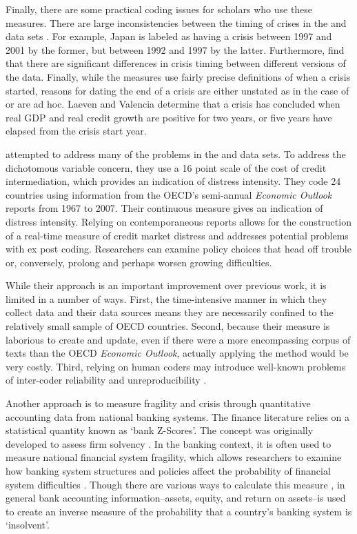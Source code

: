 \documentclass[]{article}
\begin{document}
Finally, there are some practical coding issues for scholars who use these measures. There are large inconsistencies between the timing of crises in the \cite{laeven2013} and \cite{Reinhart2009} data sets \citep{Chaudron2014}. For example, Japan is labeled as having a crisis between 1997 and 2001 by the former, but between 1992 and 1997 by the latter. Furthermore, \cite{GandrudHallerberg2015} find that there are significant differences in crisis timing between different versions of the \cite{laeven2013} data. Finally, while the measures use fairly precise definitions of when a crisis started, reasons for dating the end of a crisis are either unstated as in the case of \cite{Reinhart2009} or are ad hoc. Laeven and Valencia \citeyearpar[footnote 19]{laeven2013} determine that a crisis has concluded when real GDP and real credit growth are positive for two years, or five years have elapsed from the crisis start year.

\cite{Romer2015} attempted to address many of the problems in the \cite{Reinhart2009} and \cite{laeven2013} data sets. To address the dichotomous variable concern, they use a 16 point scale of the cost of credit intermediation, which provides an indication of distress intensity. They code 24 countries using information from the OECD's semi-annual \emph{Economic Outlook} reports from 1967 to 2007. Their  continuous measure gives an indication of distress intensity. Relying on contemporaneous reports allows for the construction of a real-time measure of credit market distress and addresses potential problems with ex post coding. Researchers can examine policy choices that head off trouble or, conversely, prolong and perhaps worsen growing difficulties.

While their approach is an important improvement over previous work, it is limited in a number of ways. First, the time-intensive manner in which they collect data and their data sources means they are necessarily confined to the relatively small sample of OECD countries. Second, because their measure is laborious to create and update, even if there were a more encompassing corpus of texts than the OECD \emph{Economic Outlook}, actually applying the method would be very costly. Third, relying on human coders may introduce well-known problems of inter-coder reliability and unreproducibility \citep{Minhas2015}.

Another approach is to measure fragility and crisis through quantitative accounting data from national banking systems. The finance literature relies on a statistical quantity known as `bank Z-Scores'. The concept was originally developed to assess firm solvency \citep[see][]{roy1952}. In the banking context, it is often used to measure national financial system fragility, which allows researchers to examine how banking system structures and policies affect the probability of financial system difficulties \citep[e.g.][]{beck2013bank,vcihak2010islamic,laeven2009bank,uhde2009}. Though there are various ways to calculate this measure \citep[73]{Lepetit2013}, in general bank accounting information--assets, equity, and return on assets--is used to create an inverse measure of the probability that a country's banking system is `insolvent'.
\end{document}
